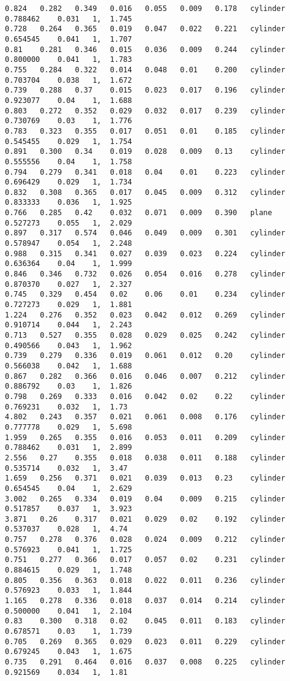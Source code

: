 {\fontsize{7.5}{10} \selectfont
	\label{code:cilindroAGC}
	\begin{lstlisting}[caption={Datos obtenidos para la prueba del cilindro usando AGC.}]
0.824	0.282	0.349	0.016	0.055	0.009	0.178	cylinder	0.788462	0.031	1, 	1.745
0.728	0.264	0.365	0.019	0.047	0.022	0.221	cylinder	0.654545	0.041	1, 	1.707
0.81	0.281	0.346	0.015	0.036	0.009	0.244	cylinder	0.800000	0.041	1, 	1.783
0.755	0.284	0.322	0.014	0.048	0.01	0.200	cylinder	0.703704	0.038	1, 	1.672
0.739	0.288	0.37	0.015	0.023	0.017	0.196	cylinder	0.923077	0.04	1, 	1.688
0.803	0.272	0.352	0.029	0.032	0.017	0.239	cylinder	0.730769	0.03	1, 	1.776
0.783	0.323	0.355	0.017	0.051	0.01	0.185	cylinder	0.545455	0.029	1, 	1.754
0.891	0.300	0.34	0.019	0.028	0.009	0.13	cylinder	0.555556	0.04	1, 	1.758
0.794	0.279	0.341	0.018	0.04	0.01	0.223	cylinder	0.696429	0.029	1, 	1.734
0.832	0.308	0.365	0.017	0.045	0.009	0.312	cylinder	0.833333	0.036	1, 	1.925
0.766	0.285	0.42	0.032	0.071	0.009	0.390	plane		0.527273	0.055	1, 	2.029
0.897	0.317	0.574	0.046	0.049	0.009	0.301	cylinder	0.578947	0.054	1, 	2.248
0.988	0.315	0.341	0.027	0.039	0.023	0.224	cylinder	0.636364	0.04	1, 	1.999
0.846	0.346	0.732	0.026	0.054	0.016	0.278	cylinder	0.870370	0.027	1, 	2.327
0.745	0.329	0.454	0.02	0.06	0.01	0.234	cylinder	0.727273	0.029	1, 	1.881
1.224	0.276	0.352	0.023	0.042	0.012	0.269	cylinder	0.910714	0.044	1, 	2.243
0.713	0.527	0.355	0.028	0.029	0.025	0.242	cylinder	0.490566	0.043	1, 	1.962
0.739	0.279	0.336	0.019	0.061	0.012	0.20	cylinder	0.566038	0.042	1, 	1.688
0.867	0.282	0.366	0.016	0.046	0.007	0.212	cylinder	0.886792	0.03	1, 	1.826
0.798	0.269	0.333	0.016	0.042	0.02	0.22	cylinder	0.769231	0.032	1, 	1.73
4.802	0.243	0.357	0.021	0.061	0.008	0.176	cylinder	0.777778	0.029	1, 	5.698
1.959	0.265	0.355	0.016	0.053	0.011	0.209	cylinder	0.788462	0.031	1, 	2.899
2.556	0.27	0.355	0.018	0.038	0.011	0.188	cylinder	0.535714	0.032	1, 	3.47
1.659	0.256	0.371	0.021	0.039	0.013	0.23	cylinder	0.654545	0.04	1, 	2.629
3.002	0.265	0.334	0.019	0.04	0.009	0.215	cylinder	0.517857	0.037	1, 	3.923
3.871	0.26	0.317	0.021	0.029	0.02	0.192	cylinder	0.537037	0.028	1, 	4.74
0.757	0.278	0.376	0.028	0.024	0.009	0.212	cylinder	0.576923	0.041	1, 	1.725
0.751	0.277	0.366	0.017	0.057	0.02	0.231	cylinder	0.884615	0.029	1, 	1.748
0.805	0.356	0.363	0.018	0.022	0.011	0.236	cylinder	0.576923	0.033	1, 	1.844
1.165	0.278	0.336	0.018	0.037	0.014	0.214	cylinder	0.500000	0.041	1, 	2.104
0.83	0.300	0.318	0.02	0.045	0.011	0.183	cylinder	0.678571	0.03	1, 	1.739
0.705	0.269	0.365	0.029	0.023	0.011	0.229	cylinder	0.679245	0.043	1, 	1.675
0.735	0.291	0.464	0.016	0.037	0.008	0.225	cylinder	0.921569	0.034	1, 	1.81

\end{lstlisting}}
